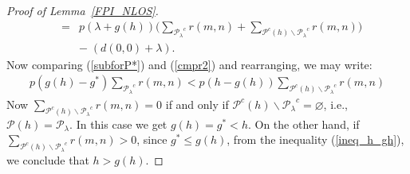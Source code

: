 \documentclass[conference]{IEEEtran}
\begin{document}
\begin{proof}[Proof of Lemma~\ref{FPI_NLOS}]
\begin{eqnarray}
&=&p(\lambda+g(h))\bigg(\sum_{{\mathcal{P}_{\lambda}}^c}r(m,n)+ \sum_{{\mathcal{P}}^c(h)\backslash{\mathcal{P}_{\lambda}}^c}r(m,n)\bigg)\nonumber\\ 
&&-\;(d(0,0)+\lambda).\label{cmpr2}
\end{eqnarray}
Now comparing (\ref{subforP*}) and (\ref{cmpr2}) and rearranging, we may write:
\begin{eqnarray}\label{ineq_h_gh}
 p(g(h)\!-\!g^*)\sum_{{\mathcal{P}_{\lambda}}^c}r(m,n)<p(h\!-\!g(h))\!\!\!
\sum_{{\mathcal{P}^c}(h)\backslash{{\mathcal{P}_{\lambda}}^c}}r(m,n)\!
\end{eqnarray}
Now $\sum_{{\mathcal{P}^c}(h)\backslash{{\mathcal{P}_{\lambda}}^c}}r(m,n)=0$ if and only if ${\mathcal{P}^c}(h)\backslash{{\mathcal{P}_{\lambda}}^c}= \varnothing $, i.e., ${\mathcal{P}}(h)={\mathcal{P}_{\lambda}}$. In this case we get $g(h)=g^*<h$. 
On the other hand, if $\sum_{{\mathcal{P}^c}(h)\backslash{{\mathcal{P}_{\lambda}}^c}}r(m,n)>0$, since $g^*\leq g(h)$, from the inequality (\ref{ineq_h_gh}), we conclude that $h>g(h)$.
\end{proof}
\end{document}
